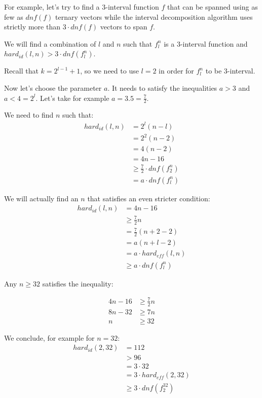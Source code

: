 \begin{example}
\label{example:3inthard}
For example,
let's try to find a $3$-interval function $f$
that can be spanned using
as few as
$\mathit{dnf}(f)$ ternary vectors
while the interval decomposition algorithm uses
strictly more than $3 \cdot \mathit{dnf}(f)$ vectors
to span $f$.

We will find a combination of $l$ and $n$
such that $f_l^n$ is a $3$-interval function
and
$\mathit{hard}_{\mathit{id}}(l,n)
> 3 \cdot \mathit{dnf}(f_l^n)$.

Recall that $k = 2^{l-1}+1$,
so we need to use $l = 2$
in order for $f_l^n$ to be $3$-interval.

Now let's choose the parameter $a$.
It needs to satisfy the inequalities $a > 3$
and $a < 4 = 2^l$.
Let's take for example $a = 3.5 = \frac{7}{2}$.

We need to find $n$ such that:
\begin{align*}
\mathit{hard}_{\mathit{id}}(l,n) &= 2^l(n-l) \\
&= 2^2(n-2) \\
&= 4 (n-2) \\
&= 4n - 16 \\
&\geq \frac{7}{2} \cdot \mathit{dnf}(f_2^n) \\
&= a \cdot \mathit{dnf}(f_l^n)
\end{align*}

We will actually find an $n$ that satisfies
an even stricter condition:
\begin{align*}
\mathit{hard}_{\mathit{id}}(l,n) &= 4n - 16 \\
&\geq \frac{7}{2} n \\
&= \frac{7}{2} (n+2-2) \\
&= a (n+l-2) \\
&= a \cdot \mathit{hard}_{\mathit{eff}}(l,n) \\
&\geq a \cdot \mathit{dnf}(f_l^n)
\end{align*}

Any $n \geq 32$ satisfies the inequality:

\begin{align*}
4n - 16 &\geq \frac{7}{2} n \\
8n - 32 &\geq 7n \\
n &\geq 32
\end{align*}

We conclude, for example for $n = 32$:
\begin{align*}
\mathit{hard}_{\mathit{id}}(2, 32)
&= 112 \\
&> 96 \\
&= 3 \cdot 32 \\
&= 3 \cdot \mathit{hard}_{\mathit{eff}}(2,32) \\
&\geq 3 \cdot \mathit{dnf}(f_2^{32})
\end{align*}


\end{example}
